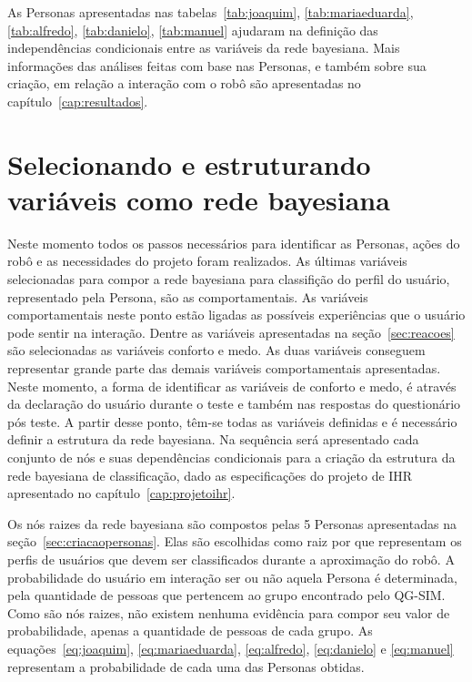 As Personas apresentadas nas tabelas~\ref{tab:joaquim}, \ref{tab:mariaeduarda}, \ref{tab:alfredo}, \ref{tab:danielo}, \ref{tab:manuel} ajudaram na definição das independências condicionais entre as variáveis da rede bayesiana. Mais informações das análises feitas com base nas Personas, e também sobre sua criação, em relação a interação com o robô são apresentadas no capítulo~\ref{cap:resultados}.

\section{Selecionando e estruturando variáveis como rede bayesiana}
\label{sec:rede-bayesiana}
Neste momento todos os passos necessários para identificar as Personas, ações do robô e as necessidades do projeto foram realizados. As últimas variáveis selecionadas para compor a rede bayesiana para classifição do perfil do usuário, representado pela Persona, são as comportamentais. As variáveis comportamentais neste ponto estão ligadas as possíveis experiências que o usuário pode sentir na interação. Dentre as variáveis apresentadas na seção~\ref{sec:reacoes} são selecionadas as variáveis conforto e medo. As duas variáveis conseguem representar grande parte das demais variáveis comportamentais apresentadas. Neste momento, a forma de identificar as variáveis de conforto e medo, é através da declaração do usuário durante o teste e também nas respostas do questionário pós teste. A partir desse ponto, têm-se todas as variáveis definidas e é necessário definir a estrutura da rede bayesiana. Na sequência será apresentado cada conjunto de nós e suas dependências condicionais para a criação da estrutura da rede bayesiana de classificação, dado as especificações do projeto de IHR apresentado no capítulo~\ref{cap:projetoihr}.

Os nós raizes da rede bayesiana são compostos pelas 5 Personas apresentadas na seção~\ref{sec:criacaopersonas}. Elas são escolhidas como raiz por que representam os perfis de usuários que devem ser classificados durante a aproximação do robô. A probabilidade do usuário em interação ser ou não aquela Persona é determinada, pela quantidade de pessoas que pertencem ao grupo encontrado pelo QG-SIM. Como são nós raizes, não existem nenhuma evidência para compor seu valor de probabilidade, apenas a quantidade de pessoas de cada grupo. As equações~\ref{eq:joaquim}, \ref{eq:mariaeduarda}, \ref{eq:alfredo}, \ref{eq:danielo} e \ref{eq:manuel} representam a probabilidade de cada uma das Personas obtidas.

